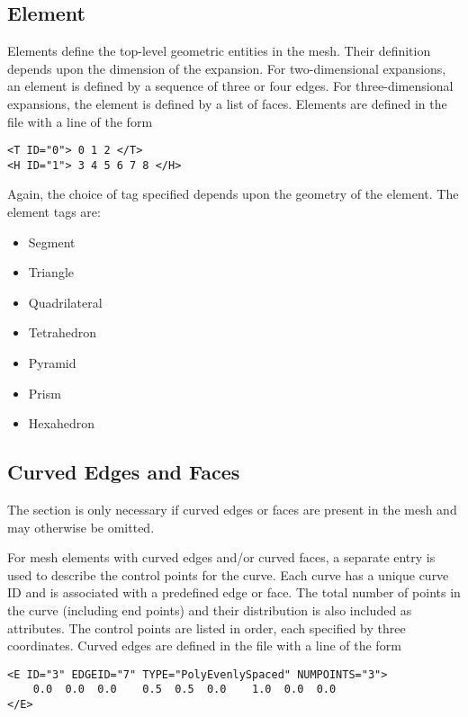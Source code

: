 \subsection{Element}
Elements define the top-level geometric entities in the mesh. Their definition depends upon the dimension of the expansion. For two-dimensional expansions, an element is defined by a sequence of three or four edges. For three-dimensional expansions, the element is defined by a list of faces. Elements are defined in the file with a line of the form
\begin{lstlisting}[style=XMLStyle]
<T ID="0"> 0 1 2 </T>
<H ID="1"> 3 4 5 6 7 8 </H>
\end{lstlisting}
Again, the choice of tag specified depends upon the geometry of the element. The element tags are:

\begin{itemize}
    \item {} Segment
    \item {} Triangle
    \item {} Quadrilateral
    \item {} Tetrahedron
    \item {} Pyramid
    \item {} Prism
    \item {} Hexahedron
\end{itemize}


\subsection{Curved Edges and Faces}
\begin{tipbox}
    The  section is only necessary if curved edges or faces are
    present in the mesh and may otherwise be omitted.
\end{tipbox}

For mesh elements with curved edges and/or curved faces, a separate entry is used to describe the control points for the curve. Each curve has a unique curve ID and is associated with a predefined edge or face. The total number of points in the curve (including end points) and their distribution is also included as attributes. The control points are listed in order, each specified by three coordinates. Curved edges are defined in the file with a line of the form
\begin{lstlisting}[style=XMLStyle]
<E ID="3" EDGEID="7" TYPE="PolyEvenlySpaced" NUMPOINTS="3">
    0.0  0.0  0.0    0.5  0.5  0.0    1.0  0.0  0.0
</E>
\end{lstlisting}


